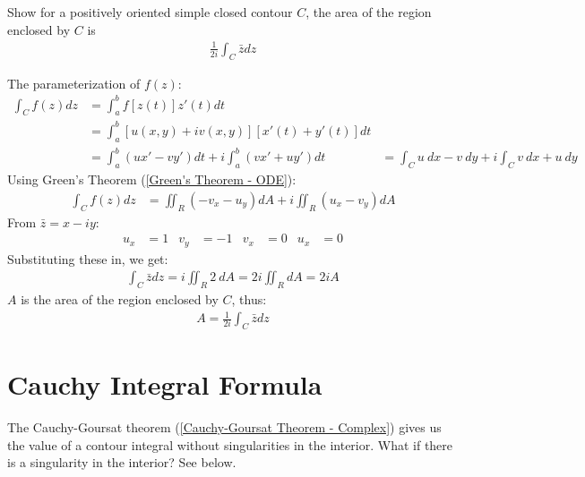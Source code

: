 \documentclass[12pt, english]{book}
\makeatletter
\renewenvironment{proof}[1][\proofname]{\par
	\pushQED{\qed}%
	\normalfont \topsep6\p@\@plus6\p@\relax
	\list{}{%
		\settowidth{\leftmargin}{\itshape\proofname:\hskip\labelsep}%
		\setlength{\labelwidth}{0pt}%
		\setlength{\itemindent}{-\leftmargin}%
		}%
	\item[\hskip\labelsep\itshape#1\@addpunct{:}]\ignorespaces
	}{\popQED\endlist\@endpefalse}
\makeatother
\begin{document}
	\begin{example}
		Show for a positively oriented simple closed contour \(C\), the area of the region enclosed by \(C\) is 
		\begin{align*}
			\frac{1}{2i} \int_{C} \bar{z} dz
		\end{align*}
		\begin{proof}
			The parameterization of \(f(z)\):
			\begin{align*}
				\int_{C} f(z) dz 
				&= \int_{a}^{b} f[z(t)] z'(t) dt \\
				&= \int_{a}^{b} [u(x,y) + iv(x,y)][x'(t) + y'(t)] dt \\
				&= \int_{a}^{b} (ux' - vy') dt + i \int_{a}^{b} (vx' + uy') dt
				&= \int_{C} u \ dx - v \ dy + i \int_{C} v \ dx + u \ dy
			\end{align*}
			Using Green's Theorem (\cref{Green's Theorem - ODE}):
			\begin{align*}
				\int_{C} f(z) dz 
				&= \iint_{R} (-v_x - u_y) dA + i \iint_{R} (u_x - v_y) dA
			\end{align*}
			{\color{Grey}
			From \(\bar{z} = x - iy\):
			\begin{align*}
				u_x &= 1 &	
				v_y &= -1 & 
				v_x &= 0 & 
				u_x &= 0
			\end{align*}
			Substituting these in, we get:
			\begin{align*}
				\int_{C} \bar{z} dz = i \iint_{R} 2 \ dA = 2i \iint_{R} dA = 2iA
			\end{align*}
			\(A\) is the area of the region enclosed by \(C\), thus:
			\begin{align*}
				A = \frac{1}{2i} \int_{C} \bar{z} dz
			\end{align*}
			}
		\end{proof}
	\end{example}
			
	


	\section{Cauchy Integral Formula} \label{Cauchy Integral Formula Section - Complex}
	
	The Cauchy-Goursat theorem (\cref{Cauchy-Goursat Theorem - Complex}) gives us the value of a contour integral without singularities in the interior. What if there is a singularity in the interior? See below.
	
\end{document}
